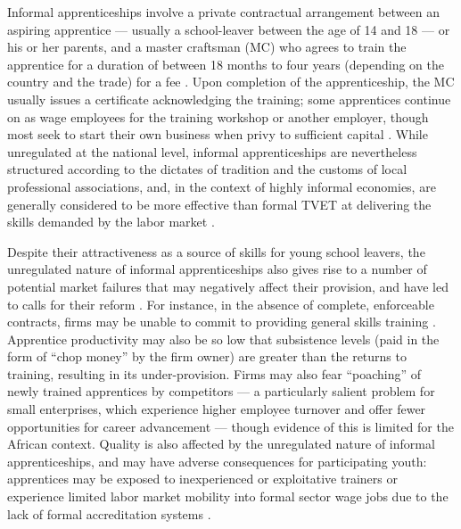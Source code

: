 \documentclass[
  a4paper, twoside, 12pt]{book}
\begin{document}
Informal apprenticeships involve a private contractual arrangement between an aspiring apprentice --- usually a school-leaver between the age of 14 and 18 --- or his or her parents, and a master craftsman (MC) who agrees to train the apprentice for a duration of between 18 months to four years (depending on the country and the trade) for a fee \autocite{hofmann2022}. Upon completion of the apprenticeship, the MC usually issues a certificate acknowledging the training; some apprentices continue on as wage employees for the training workshop or another employer, though most seek to start their own business when privy to sufficient capital \autocite{frazer2006}. While unregulated at the national level, informal apprenticeships are nevertheless structured according to the dictates of tradition and the customs of local professional associations, and, in the context of highly informal economies, are generally considered to be more effective than formal TVET at delivering the skills demanded by the labor market \autocite{ahadzie2009,africanunion2018,mayombe2021,allais2022}.

Despite their attractiveness as a source of skills for young school leavers, the unregulated nature of informal apprenticeships also gives rise to a number of potential market failures that may negatively affect their provision, and have led to calls for their reform \autocite{walther2011}. For instance, in the absence of complete, enforceable contracts, firms may be unable to commit to providing general skills training \autocite{acemoglu1998,acemoglu1999,dustmann2012}. Apprentice productivity may also be so low that subsistence levels (paid in the form of ``chop money'' by the firm owner) are greater than the returns to training, resulting in its under-provision. Firms may also fear ``poaching'' of newly trained apprentices by competitors --- a particularly salient problem for small enterprises, which experience higher employee turnover and offer fewer opportunities for career advancement \autocite{mcintosh2011} --- though evidence of this is limited for the African context. Quality is also affected by the unregulated nature of informal apprenticeships, and may have adverse consequences for participating youth: apprentices may be exposed to inexperienced or exploitative trainers or experience limited labor market mobility into formal sector wage jobs due to the lack of formal accreditation systems \autocite{acemoglu2000,worldbank2018,alfonsi2020,hofmann2022}.
\end{document}
